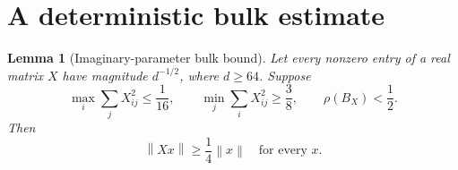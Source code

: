 \documentclass[11pt]{article}
\newtheorem{lemma}[theorem]{Lemma}
\theoremstyle{definition}
\theoremstyle{remark}
\newcommand{\norm}[1]{\left\lVert #1\right\rVert}
\begin{document}
\section{A deterministic bulk estimate}\label{sec:bulk}

\begin{lemma}[Imaginary-parameter bulk bound]\label{lem:bulk}
Let every nonzero entry of a real matrix $X$ have magnitude $d^{-1/2}$, where $d\geq64$. Suppose
\begin{equation}\label{eq:bulk-assumptions}
 \max_i\sum_jX_{ij}^2\leq\frac1{16},\qquad
 \min_j\sum_iX_{ij}^2\geq\frac38,\qquad
 \rho(B_X)<\frac12.
\end{equation}
Then
\begin{equation}\label{eq:bulk-conclusion}
 \norm{Xx}\geq\frac14\norm{x}\quad\text{for every }x.
\end{equation}
\end{lemma}
\end{document}
